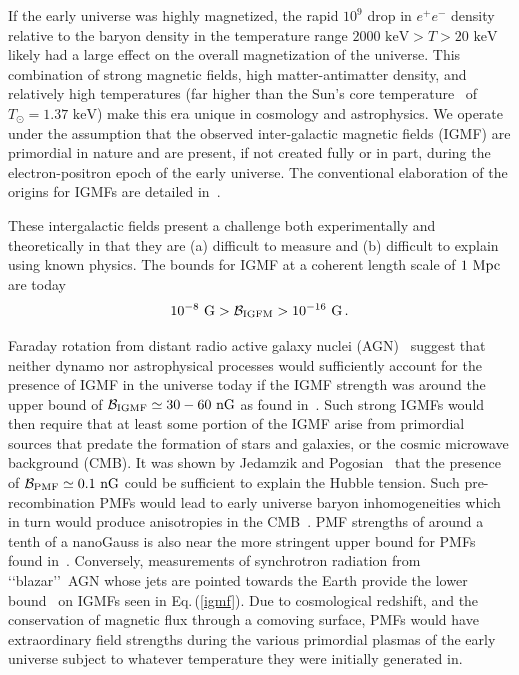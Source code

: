 \documentclass[a4paper]{article}
\newcommand*{\keV}{\text{ keV}}
\newcommand{\req}[1]{Eq.\,(\ref{#1})}
\begin{document}
If the early universe was highly magnetized, the rapid $10^{9}$ drop in $e^{+}e^{-}$ density relative to the baryon density in the temperature range $2000\keV>T>20\keV$ likely had a large effect on the overall magnetization of the universe. This combination of strong magnetic fields, high matter-antimatter density, and relatively high temperatures (far higher than the Sun's core temperature~\cite{bahcall2001solar} of $T_{\odot}=1.37\keV$) make this era unique in cosmology and astrophysics. We operate under the assumption that the observed inter-galactic magnetic fields (IGMF) are primordial in nature and are present, if not created fully or in part, during the electron-positron epoch of the early universe. The conventional elaboration of the origins for IGMFs are detailed in~\cite{gaensler2004origin,durrer2013cosmological,batista2021gammaray}.

These intergalactic fields present a challenge both experimentally and theoretically in that they are (a) difficult to measure and (b) difficult to explain using known physics. The bounds for IGMF at a coherent length scale of $1{\rm\ Mpc}$ are today~\cite{neronov2010evidence,taylor2011extragalactic,pshirkov2015new,vernstrom2021discovery}
\begin{align}
    \label{igmf}
    10^{-8}{\rm\ G}>\mathcal{B}_{\rm IGFM}>10^{-16}{\rm\ G}\,.
\end{align}

Faraday rotation from distant radio active galaxy nuclei (AGN)~\cite{pomakov2022redshift} suggest that neither dynamo nor astrophysical processes would sufficiently account for the presence of IGMF in the universe today if the IGMF strength was around the upper bound of ${\cal B}_{\rm IGMF}\simeq30-60{\rm\ nG}$ as found in~\cite{vernstrom2021discovery}. Such strong IGMFs would then require that at least some portion of the IGMF arise from primordial sources that predate the formation of stars and galaxies, or the cosmic microwave background (CMB). It was shown by Jedamzik and Pogosian~\cite{jedamzik2020relieving} that the presence of ${\cal B}_{\rm PMF}\simeq0.1{\rm\ nG}$ could be sufficient to explain the Hubble tension. Such pre-recombination PMFs would lead to early universe baryon inhomogeneities which in turn would produce anisotropies in the CMB~\cite{jedamzik2013smallscale}. PMF strengths of around a tenth of a nanoGauss is also near the more stringent upper bound for PMFs found in~\cite{pshirkov2015new,jedamzik2019stringent}. Conversely, measurements of synchrotron radiation from \lq\lq blazar\rq\rq\ AGN whose jets are pointed towards the Earth provide the lower bound~\cite{neronov2010evidence,taylor2011extragalactic} on IGMFs seen in \req{igmf}. Due to cosmological redshift, and the conservation of magnetic flux through a comoving surface, PMFs would have extraordinary field strengths during the various primordial plasmas of the early universe subject to whatever temperature they were initially generated in.
\end{document}
